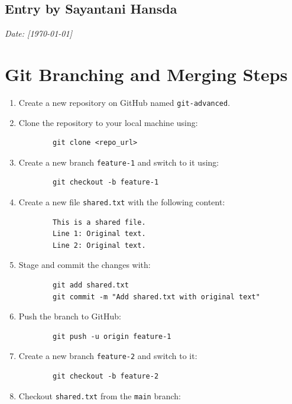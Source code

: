 \documentclass[a4paper,12pt]{article}
\begin{document}
\subsection*{Entry by Sayantani Hansda}
\textit{Date: [\today]}\\


\section*{Git Branching and Merging Steps}

\begin{enumerate}
    \item Create a new repository on GitHub named \texttt{git-advanced}.
    \item Clone the repository to your local machine using: 
        \begin{verbatim}
        git clone <repo_url>
        \end{verbatim}
    \item Create a new branch \texttt{feature-1} and switch to it using:
        \begin{verbatim}
        git checkout -b feature-1
        \end{verbatim}
    \item Create a new file \texttt{shared.txt} with the following content:
        \begin{verbatim}
        This is a shared file.
        Line 1: Original text.
        Line 2: Original text.
        \end{verbatim}
    \item Stage and commit the changes with:
        \begin{verbatim}
        git add shared.txt
        git commit -m "Add shared.txt with original text"
        \end{verbatim}
    \item Push the branch to GitHub:
        \begin{verbatim}
        git push -u origin feature-1
        \end{verbatim}
    \item Create a new branch \texttt{feature-2} and switch to it:
        \begin{verbatim}
        git checkout -b feature-2
        \end{verbatim}
    \item Checkout \texttt{shared.txt} from the \texttt{main} branch:
        \begin{verbatim}

\end{verbatim}
\end{enumerate}
\end{document}
